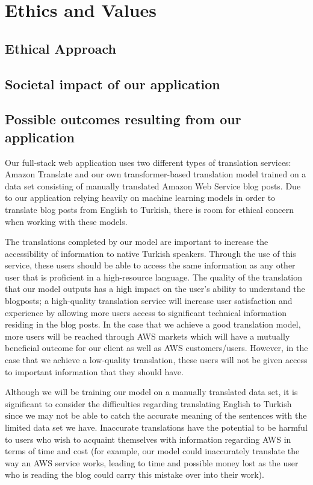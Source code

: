 \section{Ethics and Values}

\subsection{Ethical Approach}
\subsection{Societal impact of our application}
\subsection{Possible outcomes resulting from our application}

\indent \indent Our full-stack web application uses two different types of translation services: Amazon Translate and our own transformer-based translation model trained on a data set consisting of manually translated Amazon Web Service blog posts. Due to our application relying heavily on machine learning models in order to translate blog posts from English to Turkish, there is room for ethical concern when working with these models. 

\indent The translations completed by our model are important to increase the accessibility of information to native Turkish speakers. Through the use of this service, these users should be able to access the same information as any other user that is proficient in a high-resource language. The quality of the translation that our model outputs has a high impact on the user's ability to understand the blogposts; a high-quality translation service will increase user satisfaction and experience by allowing more users access to significant technical information residing in the blog posts. In the case that we achieve a good translation model, more users will be reached through AWS markets which will have a mutually beneficial outcome for our client as well as AWS customers/users. However, in the case that we achieve a low-quality translation, these users will not be given access to important information that they should have. 

\indent Although we will be training our model on a manually translated data set, it is significant to consider the difficulties regarding translating English to Turkish since we may not be able to catch the accurate meaning of the sentences with the limited data set we have. Inaccurate translations have the potential to be harmful to users who wish to acquaint themselves with information regarding AWS in terms of time and cost (for example, our model could inaccurately translate the way an AWS service works, leading to time and possible money lost as the user who is reading the blog could carry this mistake over into their work). 

